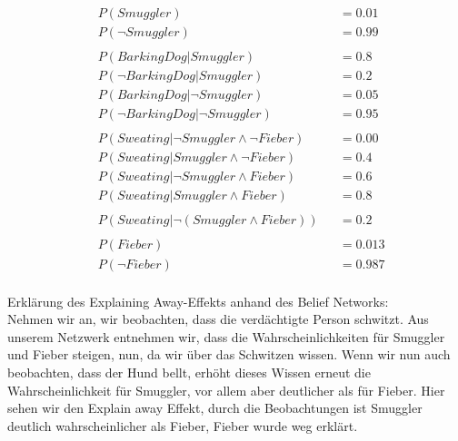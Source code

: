 \documentclass[ngerman]{fbi-aufgabenblatt}
\begin{document}


\begin{align*}
&P(Smuggler) &&= 0.01\\
&P(\neg Smuggler) &&= 0.99\\
&\\
&P(BarkingDog | Smuggler) &&= 0.8\\
&P(\neg BarkingDog | Smuggler) &&= 0.2\\
&P(BarkingDog | \neg Smuggler) &&= 0.05\\
&P(\neg BarkingDog | \neg Smuggler) &&= 0.95\\
&\\
&P(Sweating | \neg Smuggler \land  \neg Fieber) &&= 0.00\\
&P(Sweating |  Smuggler \land \neg Fieber) &&= 0.4\\
&P(Sweating |  \neg Smuggler \land Fieber) &&= 0.6\\
&P(Sweating |  Smuggler \land Fieber) &&= 0.8\\
&\\
&P(Sweating |  \neg(Smuggler \land Fieber)) &&= 0.2\\
&\\
&P(Fieber) &&= 0.013\\
&P(\neg Fieber) &&= 0.987\\
\end{align*}

Erklärung des Explaining Away-Effekts anhand des Belief Networks: \\
Nehmen wir an, wir beobachten, dass die verdächtigte Person schwitzt. Aus unserem Netzwerk entnehmen wir, dass die Wahrscheinlichkeiten für Smuggler und Fieber steigen, nun, da wir über das Schwitzen wissen. Wenn wir nun auch beobachten, dass der Hund bellt, erhöht dieses Wissen erneut die Wahrscheinlichkeit für Smuggler, vor allem aber deutlicher als für Fieber. Hier sehen wir den Explain away Effekt, durch die Beobachtungen ist Smuggler deutlich wahrscheinlicher als Fieber, Fieber wurde \glqq weg erklärt\grqq{}.
\end{document}
